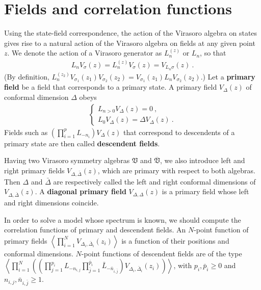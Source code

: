 \documentclass[12pt, a4paper, notitlepage, twoside]{report}
\numberwithin{equation}{section}
\theoremstyle{break}
\begin{document}
\section{Fields and correlation functions \label{secfcf}}

Using the state-field correspondence, the action of the Virasoro algebra on states gives rise to a natural action of the Virasoro algebra on fields at any given point $z$. We denote the action of a Virasoro generator as $L_n^{(z)}$ or $L_n$, so that 
\begin{align}
 L_nV_\sigma(z) = L_n^{(z)}V_\sigma(z) = V_{L_n\sigma}(z)\ .
\label{lnzv}
\end{align}
(By definition, $ L_n^{(z_2)} V_{\sigma_1}(z_1)V_{\sigma_2}(z_2) = V_{\sigma_1}(z_1) L_nV_{\sigma_2}(z_2)$.)
Let a \textbf{\boldmath primary field} be a field that corresponds to a primary state.
A primary field
$V_\Delta(z)$ of conformal dimension $\Delta$ obeys
\begin{align}
\boxed{
 \left\{\begin{array}{l}  L_{n>0} V_\Delta(z) = 0 \ , 
\\
L_0 V_\Delta(z) = \Delta V_\Delta(z) \ .
\end{array}\right. 
}
\label{ldld}
\end{align}
Fields such as  $\left(\prod_{i=1}^p L_{-n_i}\right) V_\Delta(z)$ that correspond to descendents of a primary state are then called  \textbf{descendent fields}.

Having two Virasoro symmetry algebras $\mathfrak{V}$ and $\overline{\mathfrak{V}}$, we also introduce left and right primary fields $V_{\Delta,\bar\Delta}(z)$, which are primary with respect to both algebras. Then $\Delta$ and $\bar\Delta$ are respectively called the left and right conformal dimensions of $V_{\Delta,\bar\Delta}(z)$. A \textbf{diagonal primary field} $V_{\Delta,\Delta}(z)$ is a primary field whose left and right dimensions coincide.

In order to solve a model whose spectrum is known, we should compute the correlation functions of primary and descendent fields.
An $N$-point function of primary fields $\left\langle \prod_{i=1}^N V_{\Delta_i,\bar\Delta_i}(z_i) \right\rangle$ is a function of their positions and conformal dimensions.
$N$-point functions of descendent fields are of the type $\left\langle \prod_{i=1}^N \left(\left(\prod_{j=1}^{p_i} L_{-n_{i,j}}\prod_{\bar j=1}^{\bar p_i} \bar L_{-\bar n_{i,\bar j}}\right)V_{\Delta_i,\bar\Delta_i}(z_i)\right) \right\rangle$, with $p_i,\bar p_i\geq 0$ and $n_{i,j},\bar n_{i,\bar j}\geq 1$. 
\end{document}
